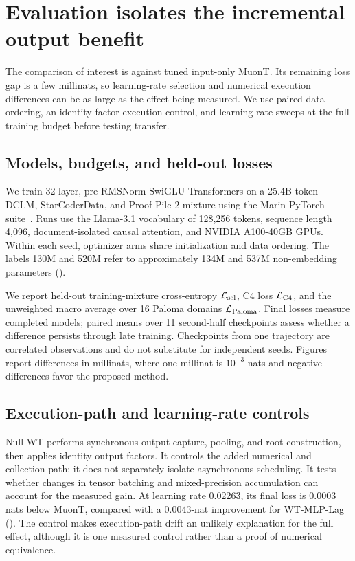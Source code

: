 \section{Evaluation isolates the incremental output benefit}
\label{sec:protocol}

The comparison of interest is against tuned input-only MuonT. Its remaining loss gap is a few millinats, so learning-rate selection and numerical execution differences can be as large as the effect being measured. We use paired data ordering, an identity-factor execution control, and learning-rate sweeps at the full training budget before testing transfer.

\subsection{Models, budgets, and held-out losses}
\label{sec:testbed}

We train 32-layer, pre-RMSNorm SwiGLU Transformers on a 25.4B-token DCLM, StarCoderData, and Proof-Pile-2 mixture using the Marin PyTorch suite~\citep{mohamadi2026toner}. Runs use the Llama-3.1 vocabulary of 128,256 tokens, sequence length 4,096, document-isolated causal attention, and NVIDIA A100-40GB GPUs. Within each seed, optimizer arms share initialization and data ordering. The labels 130M and 520M refer to approximately 134M and 537M non-embedding parameters ().



We report held-out training-mixture cross-entropy $\mathcal{L}_{\mathrm{sel}}$, C4 loss $\mathcal{L}_{\mathrm{C4}}$, and the unweighted macro average over 16 Paloma domains $\mathcal{L}_{\mathrm{Paloma}}$. Final losses measure completed models; paired means over 11 second-half checkpoints assess whether a difference persists through late training. Checkpoints from one trajectory are correlated observations and do not substitute for independent seeds. Figures report differences in millinats, where one millinat is $10^{-3}$ nats and negative differences favor the proposed method.

\subsection{Execution-path and learning-rate controls}
\label{sec:falsification}

Null-WT performs synchronous output capture, pooling, and root construction, then applies identity output factors. It controls the added numerical and collection path; it does not separately isolate asynchronous scheduling. It tests whether changes in tensor batching and mixed-precision accumulation can account for the measured gain. At learning rate 0.02263, its final loss is 0.0003 nats below MuonT, compared with a 0.0043-nat improvement for WT-MLP-Lag (). The control makes execution-path drift an unlikely explanation for the full effect, although it is one measured control rather than a proof of numerical equivalence.

